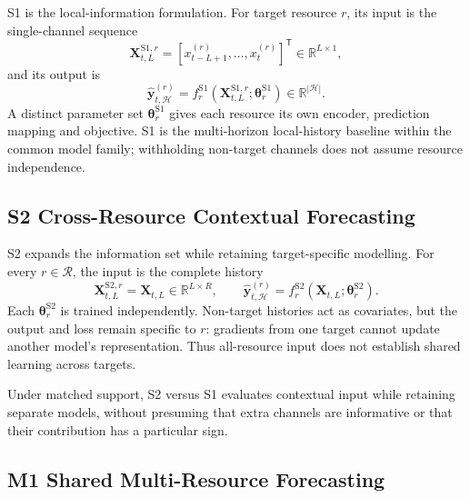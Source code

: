 \documentclass[a4paper,fleqn]{cas-dc}
\begin{document}
S1 is the local-information formulation. For target resource $r$, its input is
the single-channel sequence
\begin{equation}
  \mathbf{X}_{t,L}^{\mathrm{S1},r}
  = [x_{t-L+1}^{(r)},\ldots,x_t^{(r)}]^{\mathsf T}
  \in\mathbb{R}^{L\times 1},
  \label{eq:s1-input}
\end{equation}
and its output is
\begin{equation}
  \widehat{\mathbf{y}}_{t,\mathcal{H}}^{(r)}
  = f_r^{\mathrm{S1}}
    (\mathbf{X}_{t,L}^{\mathrm{S1},r};\boldsymbol{\theta}_r^{\mathrm{S1}})
  \in\mathbb{R}^{|\mathcal{H}|}.
  \label{eq:s1-forecast}
\end{equation}
A distinct parameter set $\boldsymbol{\theta}_r^{\mathrm{S1}}$ gives each
resource its own encoder, prediction mapping and objective. S1 is the
multi-horizon local-history baseline within the common model family;
withholding non-target channels does not assume resource independence.

\subsection{S2 Cross-Resource Contextual Forecasting}
\label{sec:s2}

S2 expands the information set while retaining target-specific modelling. For
every $r\in\mathcal{R}$, the input is the complete history
\begin{equation}
  \mathbf{X}_{t,L}^{\mathrm{S2},r}=\mathbf{X}_{t,L}
  \in\mathbb{R}^{L\times R},
  \qquad
  \widehat{\mathbf{y}}_{t,\mathcal{H}}^{(r)}
  = f_r^{\mathrm{S2}}
    (\mathbf{X}_{t,L};\boldsymbol{\theta}_r^{\mathrm{S2}}).
  \label{eq:s2-forecast}
\end{equation}
Each $\boldsymbol{\theta}_r^{\mathrm{S2}}$ is trained independently.
Non-target histories act as covariates, but the output and loss remain
specific to $r$: gradients from one target cannot update another model's
representation. Thus all-resource input does not establish shared learning
across targets.

Under matched support, S2 versus S1 evaluates contextual input while retaining
separate models, without presuming that extra channels are informative or
that their contribution has a particular sign.

\subsection{M1 Shared Multi-Resource Forecasting}
\label{sec:m1}
\end{document}

